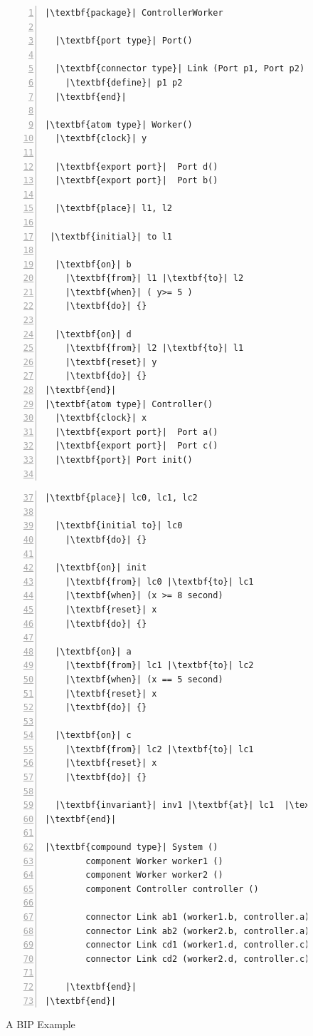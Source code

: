 \begin{figure}[H]
\begin{lstlisting}[basicstyle=\ttfamily,
escapeinside={||},
mathescape=true,
numbers=left,
backgroundcolor=\color{gray!20}]
|\textbf{package}| ControllerWorker

  |\textbf{port type}| Port()
  
  |\textbf{connector type}| Link (Port p1, Port p2)
    |\textbf{define}| p1 p2
  |\textbf{end}|

|\textbf{atom type}| Worker()
  |\textbf{clock}| y 
  
  |\textbf{export port}|  Port d()
  |\textbf{export port}|  Port b()
  
  |\textbf{place}| l1, l2
 
 |\textbf{initial}| to l1

  |\textbf{on}| b
    |\textbf{from}| l1 |\textbf{to}| l2
    |\textbf{when}| ( y>= 5 )
    |\textbf{do}| {}

  |\textbf{on}| d
    |\textbf{from}| l2 |\textbf{to}| l1
    |\textbf{reset}| y
    |\textbf{do}| {}
|\textbf{end}|
|\textbf{atom type}| Controller()
  |\textbf{clock}| x 
  |\textbf{export port}|  Port a()
  |\textbf{export port}|  Port c()
  |\textbf{port}| Port init()


\end{lstlisting}
\end{figure}


\begin{figure}[H]
\begin{lstlisting}[basicstyle=\ttfamily,
escapeinside={||},
mathescape=true,
numbers=left,
backgroundcolor=\color{gray!20},
firstnumber=37]
  |\textbf{place}| lc0, lc1, lc2
  
  |\textbf{initial to}| lc0
    |\textbf{do}| {}
  
  |\textbf{on}| init
    |\textbf{from}| lc0 |\textbf{to}| lc1
    |\textbf{when}| (x >= 8 second) 
    |\textbf{reset}| x
    |\textbf{do}| {}

  |\textbf{on}| a
    |\textbf{from}| lc1 |\textbf{to}| lc2
    |\textbf{when}| (x == 5 second)
    |\textbf{reset}| x
    |\textbf{do}| {}

  |\textbf{on}| c
    |\textbf{from}| lc2 |\textbf{to}| lc1
    |\textbf{reset}| x
    |\textbf{do}| {}

  |\textbf{invariant}| inv1 |\textbf{at}| lc1  |\textbf{when}| (x<= 5 second) 
|\textbf{end}|

|\textbf{compound type}| System ()
        component Worker worker1 ()
        component Worker worker2 ()
        component Controller controller ()
    
        connector Link ab1 (worker1.b, controller.a)
        connector Link ab2 (worker2.b, controller.a)
        connector Link cd1 (worker1.d, controller.c)
        connector Link cd2 (worker2.d, controller.c)
    
    |\textbf{end}|
|\textbf{end}|

\end{lstlisting}
\caption{A BIP Example}
\label{lst:bip}
\end{figure}
